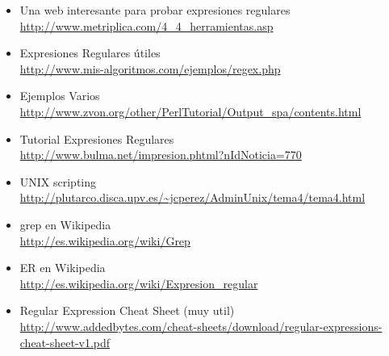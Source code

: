 \begin{itemize}
	\item Una web interesante para probar expresiones regulares\\
		\url{http://www.metriplica.com/4_4_herramientas.asp}
	\item Expresiones Regulares útiles\\
		\url{http://www.mis-algoritmos.com/ejemplos/regex.php}
	\item Ejemplos Varios\\
		\url{http://www.zvon.org/other/PerlTutorial/Output_spa/contents.html}
	\item Tutorial Expresiones Regulares\\
		\url{http://www.bulma.net/impresion.phtml?nIdNoticia=770}
	\item UNIX scripting
		\url{http://plutarco.disca.upv.es/~jcperez/AdminUnix/tema4/tema4.html}
	\item grep en Wikipedia\\
		\url{http://es.wikipedia.org/wiki/Grep}
	\item ER en Wikipedia\\
		\url{http://es.wikipedia.org/wiki/Expresion_regular}

	\item Regular Expression Cheat Sheet (muy util)\\
		\scriptsize\url{http://www.addedbytes.com/cheat-sheets/download/regular-expressions-cheat-sheet-v1.pdf}
\end{itemize}
